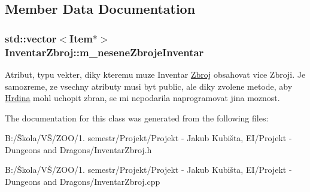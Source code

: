 \subsection{Member Data Documentation}
\hypertarget{class_inventar_zbroj_a273cf8f2260d6287911be24604b3a32f}{
\subsubsection[{m\-\_\-nesene\-Zbroje\-Inventar}]{\setlength{\rightskip}{0pt plus 5cm}std\-::vector$<${\bf Item}$\ast$$>$ Inventar\-Zbroj\-::m\-\_\-nesene\-Zbroje\-Inventar}}\label{class_inventar_zbroj_a273cf8f2260d6287911be24604b3a32f}
Atribut, typu vekter, diky kteremu muze Inventar \hyperlink{class_zbroj}{Zbroj} obsahovat vice Zbroji. Je samozreme, ze vsechny atributy musi byt public, ale diky zvolene metode, aby \hyperlink{class_hrdina}{Hrdina} mohl uchopit zbran, se mi nepodarila naprogramovat jina moznost. 

The documentation for this class was generated from the following files\-:\begin{DoxyCompactItemize}
\item 
B\-:/Škola/\-VŠ/\-Z\-O\-O/1. semestr/\-Projekt/\-Projekt -\/ Jakub Kubišta, E\-I/\-Projekt -\/ Dungeons and Dragons/Inventar\-Zbroj.\-h\item 
B\-:/Škola/\-VŠ/\-Z\-O\-O/1. semestr/\-Projekt/\-Projekt -\/ Jakub Kubišta, E\-I/\-Projekt -\/ Dungeons and Dragons/Inventar\-Zbroj.\-cpp\end{DoxyCompactItemize}
